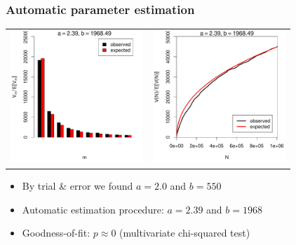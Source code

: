 \documentclass[handout,notes=show,t]{beamer} %
\begin{document}
\begin{frame}
  \frametitle{Automatic parameter estimation}

  \begin{center}
    \begin{tabular}{c @{} c}
      \includegraphics[width=50mm]{img/02-estimation-spc-estimated} &
      \includegraphics[width=50mm]{img/02-estimation-vgc-estimated} 
    \end{tabular}
  \end{center}

  \ungap[1]
  \begin{itemize}
    \item By trial \& error we found $a=2.0$ and $b=550$
    \item Automatic estimation procedure: $a=2.39$ and $b=1968$
    \item Goodness-of-fit: $p\approx 0$ (multivariate chi-squared test)
  \end{itemize}
\end{frame}
\end{document}
